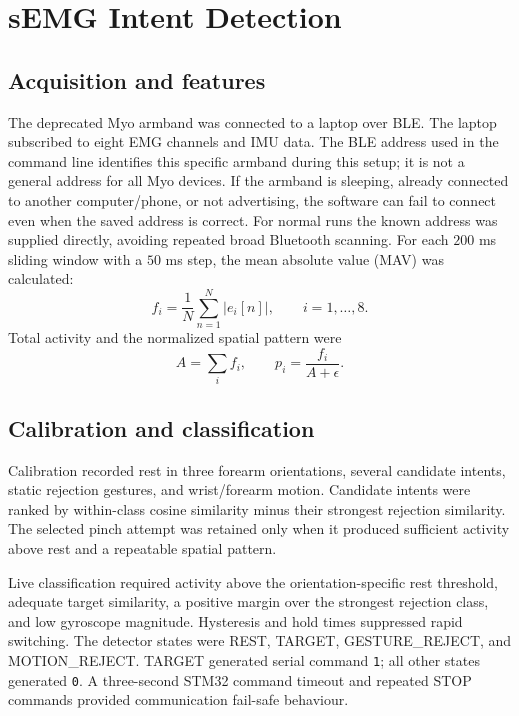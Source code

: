 \documentclass[11pt,a4paper]{report}
\begin{document}
\chapter{sEMG Intent Detection}

\section{Acquisition and features}

The deprecated Myo armband was connected to a laptop over BLE. The laptop subscribed to eight EMG channels and IMU data. The BLE address used in the command line identifies this specific armband during this setup; it is not a general address for all Myo devices. If the armband is sleeping, already connected to another computer/phone, or not advertising, the software can fail to connect even when the saved address is correct. For normal runs the known address was supplied directly, avoiding repeated broad Bluetooth scanning. For each $200$ ms sliding window with a $50$ ms step, the mean absolute value (MAV) was calculated:
\begin{equation}
f_i=\frac{1}{N}\sum_{n=1}^{N}|e_i[n]|,\qquad i=1,\ldots,8.
\end{equation}
Total activity and the normalized spatial pattern were
\begin{equation}
A=\sum_i f_i,\qquad p_i=\frac{f_i}{A+\epsilon}.
\end{equation}

\section{Calibration and classification}

Calibration recorded rest in three forearm orientations, several candidate intents, static rejection gestures, and wrist/forearm motion. Candidate intents were ranked by within-class cosine similarity minus their strongest rejection similarity. The selected pinch attempt was retained only when it produced sufficient activity above rest and a repeatable spatial pattern.

Live classification required activity above the orientation-specific rest threshold, adequate target similarity, a positive margin over the strongest rejection class, and low gyroscope magnitude. Hysteresis and hold times suppressed rapid switching. The detector states were REST, TARGET, GESTURE\_REJECT, and MOTION\_REJECT. TARGET generated serial command \texttt{1}; all other states generated \texttt{0}. A three-second STM32 command timeout and repeated STOP commands provided communication fail-safe behaviour.
\end{document}
